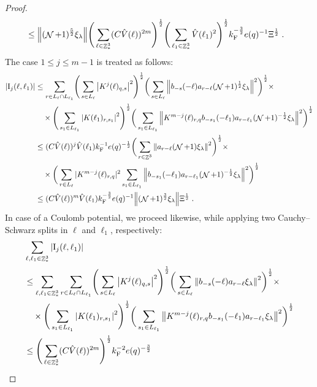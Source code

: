\documentclass[12pt,a4paper]{article}
\numberwithin{equation}{section}
\newcommand{\1}{\mathbb{I}}
\newcommand{\F}{\mathrm{F}}
\newcommand{\I}{\mathrm{I}}
\DeclareMathOperator{\Z}{\mathbb{Z}}
\DeclareMathOperator{\NN}{\mathcal{N}}
\newcommand{\half}{\frac{1}{2}}
\theoremstyle{plain}
\theoremstyle{definition}
\theoremstyle{remark}
\theoremstyle{plain}
\theoremstyle{definition}
\theoremstyle{remark}
\begin{document}
\begin{proof}
{\begin{align}
 	&\leq \norm{ (\NN+1)^{\frac 52}\xi_\lambda}
 		\Bigg( \sum\limits_{\ell \in \Z^3_*} (C \hat{V}(\ell))^{2m} \Bigg)^{\half}
 		\Bigg( \sum\limits_{\ell_1 \in \Z^3_*} \hat{V}(\ell_1)^2 \Bigg)^{\half}
 		k_{\F}^{-\frac 32} e(q)^{-1} \Xi^{\half} \;. \label{eq:estEQ2111} 
\end{align}}
The case $ 1 \le j \le m-1 $ is treated as follows:
\begin{align}
	|\I_j(\ell, \ell_1)|
	&\leq \sum\limits_{r\in L_{\ell} \cap L_{\ell_1}}\! \Bigg( \sum\limits_{s \in L_\ell} \abs{K^{j}(\ell)_{q,s}}^2\Bigg)^\half \bigg( \sum\limits_{s \in L_\ell}\norm{b_{-s}(-\ell) a_{r-\ell} (\NN+1)^{\half}\xi_\lambda}^2\bigg)^\half \times\nonumber\\
		&\quad \times \Bigg( \sum\limits_{s_1 \in L_{\ell_1}}\abs{K(\ell_1)_{r,s_1}}^2\Bigg)^\half \bigg(\sum\limits_{s_1 \in L_{\ell_1}}\norm{ K^{m-j}(\ell)_{r,q} b_{-s_1}(-\ell_1)  a_{r-\ell_1} (\NN+1)^{-\half}\xi_\lambda }^2\bigg)^\half
	\nonumber\\
	&\leq (C \hat{V}(\ell))^j \hat{V}(\ell_1) k_{\F}^{-1} e(q)^{-\half}
	\bigg( \sum\limits_{r\in \Z^3} \norm{ a_{r-\ell} (\NN+1) \xi_\lambda}^2\bigg)^\half \times \nonumber\\
		&\quad \times 
	\bigg(\sum\limits_{r\in L_{\ell}} |K^{m-j}(\ell)_{r,q} |^2
		\sum\limits_{s_1 \in L_{\ell_1}}\norm{ b_{-s_1}(-\ell_1) a_{r-\ell_1} (\NN+1)^{-\half}\xi_\lambda }^2\bigg)^\half
	\nonumber\\
	&\leq (C \hat{V}(\ell))^m
		\hat{V}(\ell_1)
		k_{\F}^{-\frac 32} e(q)^{-1}
		\norm{ (\NN+1)^{\frac 32}\xi_\lambda } \Xi^{\half} \;. \label{eq:estEQ2112}
\end{align}
\textcolor{green!30!black}{
In case of a Coulomb potential, we proceed likewise, while applying two Cauchy--Schwarz splits in $ \ell $ and $ \ell_1 $, respectively:
\begin{align}
	&\sum_{\ell,\ell_1 \in \Z^3_*} |\I_j(\ell, \ell_1)| \nonumber \\
	&\leq \sum_{\ell,\ell_1 \in \Z^3_*} \sum\limits_{r\in L_{\ell} \cap L_{\ell_1}}\! \Bigg( \sum\limits_{s \in L_\ell} \abs{K^{j}(\ell)_{q,s}}^2\Bigg)^\half \bigg( \sum\limits_{s \in L_\ell}\norm{b_{-s}(-\ell) a_{r-\ell} \xi_\lambda}^2\bigg)^\half \times\nonumber\\
		&\quad \times \Bigg( \sum\limits_{s_1 \in L_{\ell_1}}\abs{K(\ell_1)_{r,s_1}}^2\Bigg)^\half \bigg(\sum\limits_{s_1 \in L_{\ell_1}}\norm{ K^{m-j}(\ell)_{r,q} b_{-s_1}(-\ell_1)  a_{r-\ell_1} \xi_\lambda }^2\bigg)^\half
	\nonumber\\
	&\leq \Bigg( \sum_{\ell \in \Z^3_*} (C \hat{V}(\ell))^{2m} \Bigg)^{\half} k_{\F}^{-2} e(q)^{-\frac 32}

\end{align}}
\end{proof}
\end{document}
